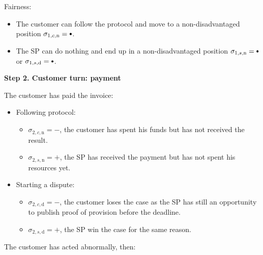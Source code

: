 \documentclass{ieeeaccess}
\newcommand\sbullet[1][.75]{\mathbin{\ThisStyle{\vcenter{\hbox{%
  \scalebox{#1}{$\SavedStyle\bullet$}}}}}%
}
\begin{document}
Fairness:

\begin{itemize}

\item
  The customer can follow the protocol and move to a non-disadvantaged position \(\sigma_{1, c, \mathrm{n}} = \sbullet\).
\item
  The SP can do nothing and end up in a non-disadvantaged position \(\sigma_{1, s, \mathrm{n}} = \sbullet \) or \(\sigma_{1, s, \mathrm{d}} = \sbullet \).
\end{itemize}

\noindent \textbf
{Step 2. Customer turn: payment}\label{step-2-pay-for-invoice}

The customer has paid the invoice:

\begin{itemize}
\item
  Following protocol:
  \begin{itemize}
  \item
    \(\sigma_{2, c, \mathrm{n}} = -\), the customer has spent his funds but has not received the result.
  \item
    \(\sigma_{2, s, \mathrm{n}} = +\), the SP has received the payment but  has not spent his resources yet.
  \end{itemize}
\item
  Starting a dispute:

  \begin{itemize}
  \item
    \(\sigma_{2, c, \mathrm{d}} = -\), the customer loses the case as the SP has still an opportunity to publish proof of provision before the deadline.
  \item
    \(\sigma_{2, s, \mathrm{d}} = +\), the SP win the case for the same reason.
  \end{itemize}
\end{itemize}

The customer has acted abnormally, then:
\end{document}
